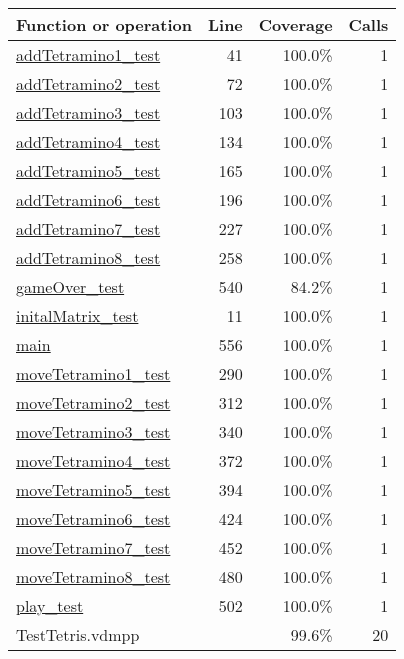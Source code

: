 \begin{longtable}{|l|r|r|r|}
\hline
Function or operation & Line & Coverage & Calls \\
\hline
\hline
\hyperref[addTetramino1:test:41]{addTetramino1\_test} & 41&100.0\% & 1 \\
\hline
\hyperref[addTetramino2:test:72]{addTetramino2\_test} & 72&100.0\% & 1 \\
\hline
\hyperref[addTetramino3:test:103]{addTetramino3\_test} & 103&100.0\% & 1 \\
\hline
\hyperref[addTetramino4:test:134]{addTetramino4\_test} & 134&100.0\% & 1 \\
\hline
\hyperref[addTetramino5:test:165]{addTetramino5\_test} & 165&100.0\% & 1 \\
\hline
\hyperref[addTetramino6:test:196]{addTetramino6\_test} & 196&100.0\% & 1 \\
\hline
\hyperref[addTetramino7:test:227]{addTetramino7\_test} & 227&100.0\% & 1 \\
\hline
\hyperref[addTetramino8:test:258]{addTetramino8\_test} & 258&100.0\% & 1 \\
\hline
\hyperref[gameOver:test:540]{gameOver\_test} & 540&84.2\% & 1 \\
\hline
\hyperref[initalMatrix:test:11]{initalMatrix\_test} & 11&100.0\% & 1 \\
\hline
\hyperref[main:556]{main} & 556&100.0\% & 1 \\
\hline
\hyperref[moveTetramino1:test:290]{moveTetramino1\_test} & 290&100.0\% & 1 \\
\hline
\hyperref[moveTetramino2:test:312]{moveTetramino2\_test} & 312&100.0\% & 1 \\
\hline
\hyperref[moveTetramino3:test:340]{moveTetramino3\_test} & 340&100.0\% & 1 \\
\hline
\hyperref[moveTetramino4:test:372]{moveTetramino4\_test} & 372&100.0\% & 1 \\
\hline
\hyperref[moveTetramino5:test:394]{moveTetramino5\_test} & 394&100.0\% & 1 \\
\hline
\hyperref[moveTetramino6:test:424]{moveTetramino6\_test} & 424&100.0\% & 1 \\
\hline
\hyperref[moveTetramino7:test:452]{moveTetramino7\_test} & 452&100.0\% & 1 \\
\hline
\hyperref[moveTetramino8:test:480]{moveTetramino8\_test} & 480&100.0\% & 1 \\
\hline
\hyperref[play:test:502]{play\_test} & 502&100.0\% & 1 \\
\hline
\hline
TestTetris.vdmpp & & 99.6\% & 20 \\
\hline
\end{longtable}

